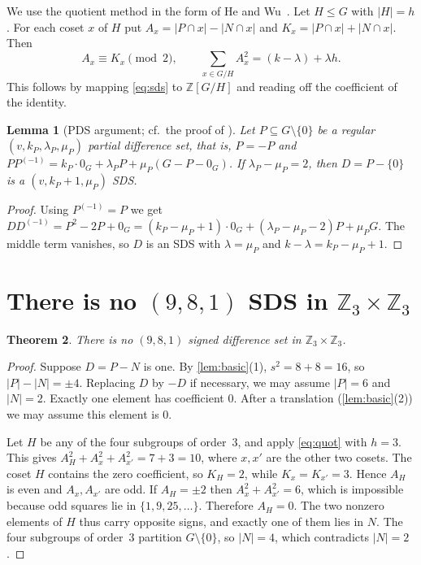 \documentclass[11pt]{article}
\numberwithin{equation}{section}
\newtheorem{theorem}{Theorem}[section]
\newtheorem{lemma}[theorem]{Lemma}
\theoremstyle{definition}
\theoremstyle{remark}
\newcommand{\Z}{\mathbb Z}
\begin{document}
We use the quotient method in the form of He and Wu~\cite[Lemma~4.1]{HeWu2026}. Let $H\le G$ with
$|H|=h$. For each coset $x$ of $H$ put $A_x=|P\cap x|-|N\cap x|$ and $K_x=|P\cap x|+|N\cap x|$.
Then
\begin{equation}\label{eq:quot}
A_x\equiv K_x\pmod 2,\qquad \sum_{x\in G/H}A_x^2=(k-\lambda)+\lambda h .
\end{equation}
This follows by mapping \eqref{eq:sds} to $\Z[G/H]$ and reading off the coefficient of the
identity.

\begin{lemma}[PDS argument; cf.\ the proof of {\cite[Thm.~5.3]{HeWu2026}}]\label{lem:pds}
Let $P\subseteq G\setminus\{0\}$ be a regular $(v,k_P,\lambda_P,\mu_P)$ partial difference set,
that is, $P=-P$ and $PP^{(-1)}=k_P\cdot 0_G+\lambda_PP+\mu_P(G-P-0_G)$. If $\lambda_P-\mu_P=2$,
then $D=P-\{0\}$ is a $(v,k_P+1,\mu_P)$ SDS.
\end{lemma}
\begin{proof}
Using $P^{(-1)}=P$ we get $DD^{(-1)}=P^2-2P+0_G=(k_P-\mu_P+1)\cdot0_G+(\lambda_P-\mu_P-2)P+\mu_P G$.
The middle term vanishes, so $D$ is an SDS with $\lambda=\mu_P$ and $k-\lambda=k_P-\mu_P+1$.
\end{proof}

\section{There is no \texorpdfstring{$(9,8,1)$}{(9,8,1)} SDS in \texorpdfstring{$\Z_3\times\Z_3$}{Z3 x Z3}}\label{sec:981}

\begin{theorem}\label{thm:981}
There is no $(9,8,1)$ signed difference set in $\Z_3\times\Z_3$.
\end{theorem}
\begin{proof}
Suppose $D=P-N$ is one. By \cref{lem:basic}(1), $s^2=8+8=16$, so $|P|-|N|=\pm4$. Replacing
$D$ by $-D$ if necessary, we may assume $|P|=6$ and $|N|=2$. Exactly one element has coefficient
$0$. After a translation (\cref{lem:basic}(2)) we may assume this element is $0$.

Let $H$ be any of the four subgroups of order~$3$, and apply \eqref{eq:quot} with $h=3$. This
gives $A_H^2+A_{x}^2+A_{x'}^2=7+3=10$, where $x,x'$ are the other two cosets. The coset $H$
contains the zero coefficient, so $K_H=2$, while $K_x=K_{x'}=3$. Hence $A_H$ is even and
$A_x,A_{x'}$ are odd. If $A_H=\pm2$ then $A_x^2+A_{x'}^2=6$, which is impossible because odd
squares lie in $\{1,9,25,\dots\}$. Therefore $A_H=0$. The two nonzero elements of $H$ thus carry
opposite signs, and exactly one of them lies in $N$. The four subgroups of order~$3$ partition
$G\setminus\{0\}$, so $|N|=4$, which contradicts $|N|=2$.
\end{proof}
\end{document}
